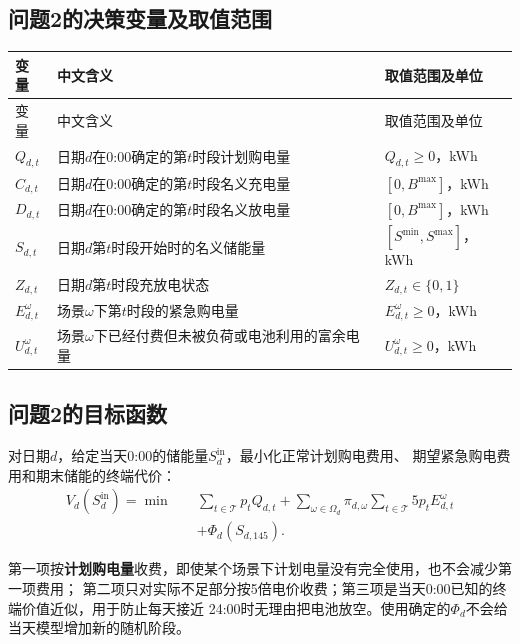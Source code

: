 \documentclass[UTF8,11pt]{ctexart}
\begin{document}
\subsection{问题2的决策变量及取值范围}

\begin{longtable}{>{\centering\arraybackslash}p{3.0cm}p{7.0cm}p{2.2cm}}
\toprule
变量 & 中文含义 & 取值范围及单位 \\
\midrule
\endfirsthead
\toprule
变量 & 中文含义 & 取值范围及单位 \\
\midrule
\endhead
$Q_{d,t}$ & 日期$d$在0:00确定的第$t$时段计划购电量 & $Q_{d,t}\geq0$，kWh \\
$C_{d,t}$ & 日期$d$在0:00确定的第$t$时段名义充电量 & $[0,B^{\max}]$，kWh \\
$D_{d,t}$ & 日期$d$在0:00确定的第$t$时段名义放电量 & $[0,B^{\max}]$，kWh \\
$S_{d,t}$ & 日期$d$第$t$时段开始时的名义储能量 & $[S^{\min},S^{\max}]$，kWh \\
$Z_{d,t}$ & 日期$d$第$t$时段充放电状态 & $Z_{d,t}\in\{0,1\}$ \\
$E^{\omega}_{d,t}$ & 场景$\omega$下第$t$时段的紧急购电量 & $E^{\omega}_{d,t}\geq0$，kWh \\
$U^{\omega}_{d,t}$ & 场景$\omega$下已经付费但未被负荷或电池利用的富余电量 & $U^{\omega}_{d,t}\geq0$，kWh \\
\bottomrule
\end{longtable}

\subsection{问题2的目标函数}

对日期$d$，给定当天0:00的储能量$S^{\mathrm{in}}_d$，最小化正常计划购电费用、
期望紧急购电费用和期末储能的终端代价：
\begin{equation}
\begin{aligned}
    V_d\!\left(S^{\mathrm{in}}_d\right)
    =\min\quad
    &\sum_{t\in\mathcal{T}}p_tQ_{d,t}
    +\sum_{\omega\in\Omega_d}\pi_{d,\omega}
      \sum_{t\in\mathcal{T}}5p_tE^{\omega}_{d,t} \\
    &+\Phi_d(S_{d,145}).
\end{aligned}
\label{eq:q2-objective}
\end{equation}

第一项按\textbf{计划购电量}收费，即使某个场景下计划电量没有完全使用，也不会减少第一项费用；
第二项只对实际不足部分按5倍电价收费；第三项是当天0:00已知的终端价值近似，用于防止每天接近
24:00时无理由把电池放空。使用确定的$\Phi_d$不会给当天模型增加新的随机阶段。
\end{document}
